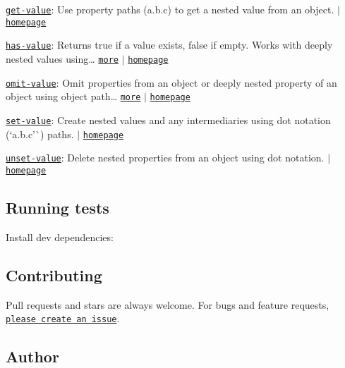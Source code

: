 \begin{DoxyItemize}
\item \href{https://www.npmjs.com/package/get-value}{\tt get-\/value}\+: Use property paths ({\ttfamily a.\+b.\+c}) to get a nested value from an object. $\vert$ \href{https://github.com/jonschlinkert/get-value}{\tt homepage}
\item \href{https://www.npmjs.com/package/has-value}{\tt has-\/value}\+: Returns true if a value exists, false if empty. Works with deeply nested values using… \href{https://www.npmjs.com/package/has-value}{\tt more} $\vert$ \href{https://github.com/jonschlinkert/has-value}{\tt homepage}
\item \href{https://www.npmjs.com/package/omit-value}{\tt omit-\/value}\+: Omit properties from an object or deeply nested property of an object using object path… \href{https://www.npmjs.com/package/omit-value}{\tt more} $\vert$ \href{https://github.com/jonschlinkert/omit-value}{\tt homepage}
\item \href{https://www.npmjs.com/package/set-value}{\tt set-\/value}\+: Create nested values and any intermediaries using dot notation (`\textquotesingle{}a.\+b.\+c'\`{}) paths. $\vert$ \href{https://github.com/jonschlinkert/set-value}{\tt homepage}
\item \href{https://www.npmjs.com/package/unset-value}{\tt unset-\/value}\+: Delete nested properties from an object using dot notation. $\vert$ \href{https://github.com/jonschlinkert/unset-value}{\tt homepage}
\end{DoxyItemize}

\subsection*{Running tests}

Install dev dependencies\+:




\subsection*{Contributing}

Pull requests and stars are always welcome. For bugs and feature requests, \href{https://github.com/jonschlinkert/to-object-path/issues/new}{\tt please create an issue}.

\subsection*{Author}

